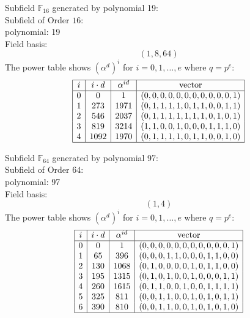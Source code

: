 \bigskip

Subfield ${\mathbb F}_{16}$ generated by polynomial 19:\\
Subfield of Order $16$:\\
polynomial: 19\\
Field basis:\\
$$
( 1, 8, 64 )
$$
The power table shows $(\alpha^d)^i$ for $i=0,1,\ldots,e$ where $q=p^{e}$:
$$
\begin{array}{|c|c|c|c|}
\hline
i & i\cdot d  & \alpha^{id} & \mbox{vector} \\
\hline
0 & 0 & 1 & (0,0,0,0,0,0,0,0,0,0,0,1)\\
1 & 273 & 1971 & (0,1,1,1,1,0,1,1,0,0,1,1)\\
2 & 546 & 2037 & (0,1,1,1,1,1,1,1,0,1,0,1)\\
3 & 819 & 3214 & (1,1,0,0,1,0,0,0,1,1,1,0)\\
4 & 1092 & 1970 & (0,1,1,1,1,0,1,1,0,0,1,0)\\
\hline
\end{array}
$$

\bigskip

Subfield ${\mathbb F}_{64}$ generated by polynomial 97:\\
Subfield of Order $64$:\\
polynomial: 97\\
Field basis:\\
$$
( 1, 4 )
$$
$$
$$
The power table shows $(\alpha^d)^i$ for $i=0,1,\ldots,e$ where $q=p^{e}$:
$$
\begin{array}{|c|c|c|c|}
\hline
i & i\cdot d  & \alpha^{id} & \mbox{vector} \\
\hline
0 & 0 & 1 & (0,0,0,0,0,0,0,0,0,0,0,1)\\
1 & 65 & 396 & (0,0,0,1,1,0,0,0,1,1,0,0)\\
2 & 130 & 1068 & (0,1,0,0,0,0,1,0,1,1,0,0)\\
3 & 195 & 1315 & (0,1,0,1,0,0,1,0,0,0,1,1)\\
4 & 260 & 1615 & (0,1,1,0,0,1,0,0,1,1,1,1)\\
5 & 325 & 811 & (0,0,1,1,0,0,1,0,1,0,1,1)\\
6 & 390 & 810 & (0,0,1,1,0,0,1,0,1,0,1,0)\\
\hline
\end{array}
$$
